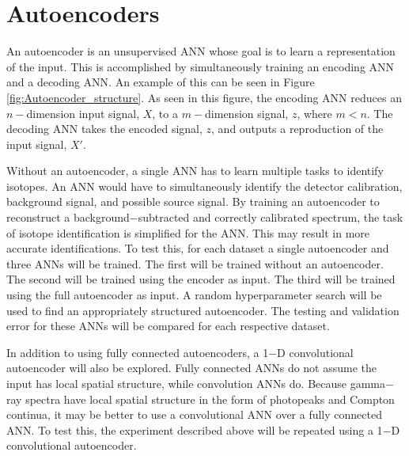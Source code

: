 \documentclass[tocnosub,noragright,centerchapter,12pt,fullpage]{uiucecethesis09}
\begin{document}
\section{Autoencoders} \label{Autoencoders}


An autoencoder is an unsupervised ANN whose goal is to learn a representation of the input. This is accomplished by simultaneously training an encoding ANN and a decoding ANN. An example of this can be seen in Figure \ref{fig:Autoencoder_structure}. As seen in this figure, the encoding ANN reduces an $n-$dimension input signal, $X$, to a $m-$dimension signal, $z$, where $m < n$. The decoding ANN takes the encoded signal, $z$, and outputs a reproduction of the input signal, $X'$.


Without an autoencoder, a single ANN has to learn multiple tasks to identify isotopes. An ANN would have to simultaneously identify the detector calibration, background signal, and possible source signal. By training an autoencoder to reconstruct a background$-$subtracted and correctly calibrated spectrum, the task of isotope identification is simplified for the ANN. This may result in more accurate identifications. To test this, for each dataset a single autoencoder and three ANNs will be trained. The first will be trained without an autoencoder. The second will be trained using the encoder as input. The third will be trained using the full autoencoder as input. A random hyperparameter search will be used to find an appropriately structured autoencoder. The testing and validation error for these ANNs will be compared for each respective dataset.

In addition to using fully connected autoencoders, a 1$-$D convolutional autoencoder will also be explored. Fully connected ANNs do not assume the input has local spatial structure, while convolution ANNs do. Because gamma$-$ray spectra have local spatial structure in the form of photopeaks and Compton continua, it may be better to use a convolutional ANN over a fully connected ANN. To test this, the experiment described above will be repeated using a 1$-$D convolutional autoencoder.

\end{document}
